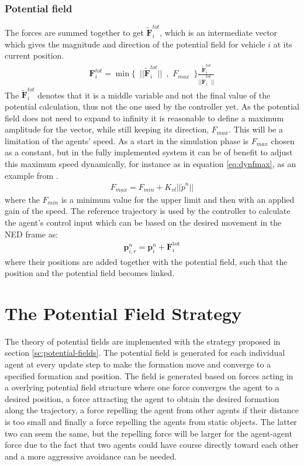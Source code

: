 \subsubsection{Potential field}
The forces are summed together to get
$\tilde{\mathbf{F}}_i^{tot}$, which is an intermediate vector which gives the magnitude and direction of the
potential field for vehicle $i$ at its current position.
\begin{align}
  \mathbf{F}_i^{tot} = \min\{\,\,\,||\tilde{\mathbf{F}}_i^{tot}||\,\,\,,\,\,F_{max}\,\,\,\}\frac{\tilde{\mathbf{F}}_i^{tot}}{||\tilde{\mathbf{F}}_i^{tot}||}
\end{align}
The $\tilde{\mathbf{F}}_i^{tot}$ denotes that it is a middle variable and not the final value of the potential calculation, thus not the one used by the controller yet.
As the potential field does not need to expand to infinity it is reasonable to define a maximum amplitude for the vector, while still keeping its direction, $F_{max}$. This will be a limitation of the agents' speed. As a start in the simulation phase is $F_{max}$ chosen as a constant, but in the fully implemented system it can be of benefit to adjust this maximum speed dynamically, for instance as in equation \ref{eq:dynfmax}, as an example from \citep{UAVff3dpf}.
\begin{align}
F_{max} = F_{min} + K_{vl}||\dot{p}^n||
\label{eq:dynfmax}
\end{align}
where the $F_{min}$ is a minimum value for the upper limit and then with an applied gain of the speed. 
The reference trajectory is used by the controller to calculate the agent's control input which can be based on the desired movement in the NED frame as:
\begin{align}
  \mathbf{p}_{i,r}^n = \mathbf{p}_i^n + \mathbf{F}_i ^\text{tot}
\end{align}
where their positions are added together with the potential field, such that the position and the potential field becomes linked.

\section{The Potential Field Strategy}
The theory of potential fields are implemented with the strategy
proposed in section \ref{sc:potential-fields}. The potential field is
generated for each individual agent at every update step to make the
formation move and converge to a specified formation and position. The
field is generated based on forces acting in a overlying potential
field structure where one force converges the agent to a desired
position, a force attracting the agent to obtain the desired formation
along the trajectory, a force repelling the agent from other agents if
their distance is too small and finally a force repelling the agents
from static objects. The latter two can seem the same, but the
repelling force will be larger for the agent-agent force due to the
fact that two agents could have course directly toward each other and
a more aggressive avoidance can be needed.

